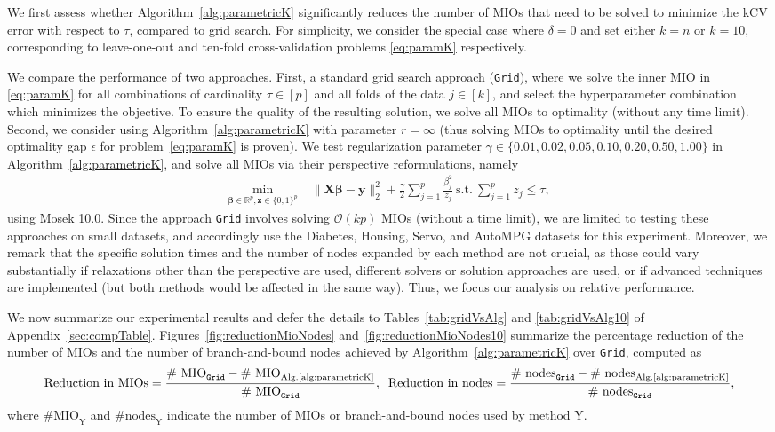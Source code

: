 \documentclass[mnsc,nonblindrev]{informs3} %
\begin{document}
We first assess whether Algorithm~\ref{alg:parametricK} significantly reduces the number of MIOs that need to be solved to minimize the kCV error with respect to $\tau$, compared to grid search. For simplicity, we consider the special case where $\delta=0$ and set either $k=n$ or $k=10$, corresponding to leave-one-out and ten-fold cross-validation problems \eqref{eq:paramK} respectively.

We compare the performance of two approaches. First, a standard grid search approach (\texttt{Grid}), where we solve the inner MIO in \eqref{eq:paramK} for all combinations of cardinality $\tau\in [p]$ and all folds of the data $j\in [k]$, and select the hyperparameter combination which minimizes the objective. To ensure the quality of the resulting solution, we solve all MIOs to optimality (without any time limit). Second, we consider using Algorithm~\ref{alg:parametricK} with parameter $r=\infty$ (thus solving MIOs to optimality until the desired optimality gap $\epsilon$ for problem~\eqref{eq:paramK} is proven). We test regularization parameter $\gamma\in \{0.01,0.02,0.05,0.10,0.20,0.50,1.00\}$ in Algorithm~\ref{alg:parametricK}, and solve all MIOs via their perspective reformulations, namely
\begin{align*}
	\min_{\bm{\beta}\in \mathbb{R}^p,\bm{z}\in \{0,1\}^p}\;& \|\bm{X}\bm{\beta}-\bm{y}\|_2^2+\frac{\gamma}{2}\sum_{j=1}^p \frac{\beta_j^2}{z_j}\ \text{s.t.}\ \sum_{j=1}^p z_j\leq \tau,
\end{align*} 
using Mosek 10.0. Since the approach \texttt{Grid} involves solving $\mathcal{O}(kp)$ MIOs (without a time limit), we are limited to testing these approaches on small datasets, and accordingly use the Diabetes, Housing, Servo, and AutoMPG datasets for this experiment. Moreover, we remark that the specific solution times and the number of nodes expanded by each method are not crucial, as those could vary substantially if relaxations other than the perspective are used, different solvers or solution approaches are used, or if advanced techniques are implemented (but both methods would be affected in the same way). Thus, we focus our analysis on relative performance.

We now summarize our experimental results and defer the details to Tables~\ref{tab:gridVsAlg} and \ref{tab:gridVsAlg10} of Appendix~\ref{sec:compTable}. Figures~\ref{fig:reductionMioNodes} and~\ref{fig:reductionMioNodes10} summarize the percentage reduction of the number of MIOs and the number of branch-and-bound nodes achieved by Algorithm~\ref{alg:parametricK} over \texttt{Grid}, computed as 
\small$$ \text{Reduction in MIOs}=\frac{\text{\# MIO}_{\texttt{Grid}}-\text{\# MIO}_{\text{Alg.\ref{alg:parametricK}}}}{\text{\# MIO}_{\texttt{Grid}}},\;\; \text{Reduction in nodes}=\frac{\text{\# nodes}_{\texttt{Grid}}-\text{\# nodes}_{\text{Alg.\ref{alg:parametricK}}}}{\text{\# nodes}_{\texttt{Grid}}},$$\normalsize
where $\text{\# MIO}_{\text{Y}}$ and $\text{\# nodes}_{\text{Y}}$ indicate the number of MIOs or branch-and-bound nodes used by method Y.  
\end{document}
